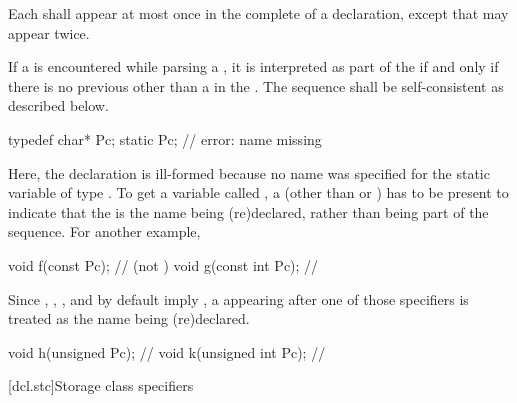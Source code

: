 \pnum
Each  shall appear at most once in the complete
 of a declaration, except that
 may appear twice.

\pnum
{}%
If a  is encountered while parsing a ,
it is interpreted as part of the  if and only if there is no
previous  other than a  in the
.
The sequence shall be self-consistent as
described below.
\enterexample

\begin{codeblock}
typedef char* Pc;
static Pc;                      // error: name missing
\end{codeblock}

Here, the declaration   is ill-formed because no
name was specified for the static variable of type . To get a
variable called , a  (other than
 or ) has to be present to indicate that
the   is the name being (re)declared,
rather than being part of the  sequence. For
another example,

\begin{codeblock}
void f(const Pc);               //  (not )
void g(const int Pc);           // 
\end{codeblock}
\exitexample

\pnum
{}%
%
%
%
\enternote
Since , , , and 
by default imply , a  appearing after one
of those specifiers is treated as the name being (re)declared.
\enterexample

\begin{codeblock}
void h(unsigned Pc);            // 
void k(unsigned int Pc);        // 
\end{codeblock}
\exitexample
\exitnote

[dcl.stc]{Storage class specifiers}%
%
%
%
%
%
%

